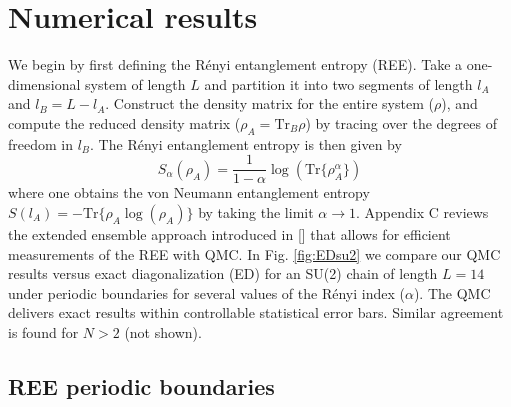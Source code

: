 \documentclass[aps,prb,reprint,floatfix]{revtex4-1}
\begin{document}
\section{Numerical results} 
\label{sec:data}

We begin by first defining the R\'{e}nyi entanglement entropy (REE).  Take a one-dimensional system of length $L$ and partition it into two segments of length $l_{A}$ and $l_{B}=L-l_{A}$.  Construct the density matrix for the entire system ($\rho$), and compute the reduced density matrix ($\rho_{A}=\mathrm{Tr}_{B}\rho$) by tracing over the degrees of freedom in $l_{B}$.  The R\'{e}nyi entanglement entropy is then given by
\begin{equation}
		S_{\alpha}(\rho_{A})= \frac{1}{1-\alpha}\log(\text{Tr}\{ \rho^{\alpha}_{A} \})
\label{eq:REE}
\end{equation}
where one obtains the von Neumann entanglement entropy $S(l_{A})=-\textrm{Tr}\{\rho_{A}\log(\rho_{A})\}$ by taking the limit $\alpha\to1$.  Appendix C reviews the extended ensemble approach introduced in [] that allows for efficient measurements of the REE with QMC.  In Fig. \ref{fig:EDsu2} we compare our QMC results versus exact diagonalization (ED) for an SU(2) chain of length $L=14$ under periodic boundaries for several values of the R\'{e}nyi index ($\alpha$).    The QMC delivers exact results within controllable statistical error bars.  Similar agreement is found for $N>2$ (not shown).

\subsection{REE periodic boundaries} 
\label{subsec:REEclosedBC}
\end{document}
